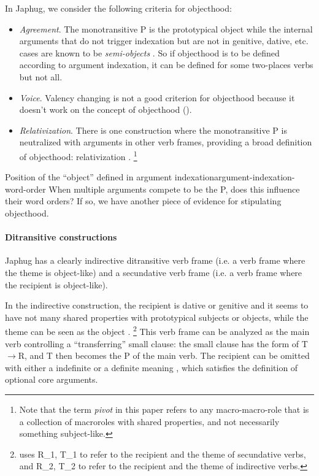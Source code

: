 \documentclass[a4paper, oneside, 12pt]{report}
\newcommand*{\textto}{$\to$}
\newcommand*{\citesec}[1]{\S~{#1}}
\newcommand*{\term}[1]{\emph{#1}}
\begin{document}
In Japhug, we consider the following criteria for objecthood:
\begin{itemize}
    \item \emph{Agreement}. The monotransitive P is the prototypical object
    while the internal arguments that do not trigger indexation 
    but are not in genitive, dative, etc. cases
    are known to be \term{semi-objects}
    \citep[\citesec{8.1.5}]{jacques2021grammar}.
    So if objecthood is to be defined according to argument indexation,
    it can be defined for some two-places verbs but not all.
    
    \item \emph{Voice}. Valency changing is not a good criterion for objecthood
    because it doesn't work on the concept of objecthood ().

    \item \emph{Relativization}. There is one construction where the monotransitive P is neutralized with
    arguments in other verb frames, providing a broad definition of objecthood:
    relativization \citep{jacques2016subjects}.%
    \footnote{
        Note that the term \term{pivot} in this paper refers to 
        any macro-macro-role that is a collection of macroroles with shared properties,
        and not necessarily something subject-like.
    }
\end{itemize}

\begin{todobox}{Position of the ``object'' defined in argument indexation}{argument-indexation-word-order}
    When multiple arguments compete to be the P,
    does this influence their word orders?
    If so, we have another piece of evidence for stipulating objecthood.
\end{todobox}



\paragraph*{Ditransitive constructions}
Japhug has a clearly indirective ditransitive verb frame
(i.e. a verb frame where the theme is object-like)
and a secundative verb frame  
(i.e. a verb frame where the recipient is object-like).

In the indirective construction,
the recipient is dative or genitive \citep[\citesec{14.4.1}]{jacques2021grammar}
and it seems to have not many shared properties with prototypical subjects or objects,
while the theme can be seen as the object \citep{jacques2016subjects}.%
\footnote{
    \citet{jacques2016subjects} 
    uses R_1, T_1 to refer to the recipient and the theme of secundative verbs,
    and R_2, T_2 to refer to the recipient and the theme of indirective verbs. 
}
This verb frame can be analyzed as the main verb controlling a ``transferring'' small clause:
the small clause has the form of T\textto R,
and T then becomes the P of the main verb.
The recipient can be omitted with either a indefinite or a definite meaning
\citep[\citesec{22.1.2.2}, (29-30)]{jacques2021grammar},
which satisfies the definition of optional core arguments.
\end{document}
